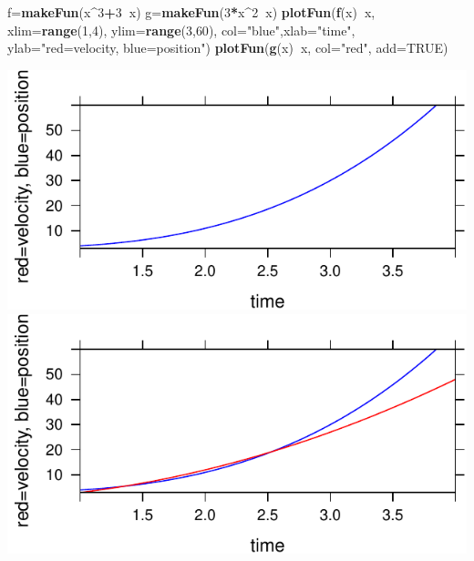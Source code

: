 \documentclass[
]{book}
\newenvironment{Shaded}{\begin{snugshade}}{\end{snugshade}}
\newcommand{\DataTypeTok}[1]{\textcolor[rgb]{0.13,0.29,0.53}{#1}}
\newcommand{\DecValTok}[1]{\textcolor[rgb]{0.00,0.00,0.81}{#1}}
\newcommand{\KeywordTok}[1]{\textcolor[rgb]{0.13,0.29,0.53}{\textbf{#1}}}
\newcommand{\NormalTok}[1]{#1}
\newcommand{\OperatorTok}[1]{\textcolor[rgb]{0.81,0.36,0.00}{\textbf{#1}}}
\newcommand{\OtherTok}[1]{\textcolor[rgb]{0.56,0.35,0.01}{#1}}
\newcommand{\StringTok}[1]{\textcolor[rgb]{0.31,0.60,0.02}{#1}}
\begin{document}
\begin{Shaded}
\begin{Highlighting}[]
\NormalTok{f=}\KeywordTok{makeFun}\NormalTok{(x}\OperatorTok{^}\DecValTok{3}\OperatorTok{+}\DecValTok{3}\OperatorTok{~}\NormalTok{x)}
\NormalTok{g=}\KeywordTok{makeFun}\NormalTok{(}\DecValTok{3}\OperatorTok{*}\NormalTok{x}\OperatorTok{^}\DecValTok{2}\OperatorTok{~}\NormalTok{x)}
\KeywordTok{plotFun}\NormalTok{(}\KeywordTok{f}\NormalTok{(x)}\OperatorTok{~}\NormalTok{x, }\DataTypeTok{xlim=}\KeywordTok{range}\NormalTok{(}\DecValTok{1}\NormalTok{,}\DecValTok{4}\NormalTok{), }\DataTypeTok{ylim=}\KeywordTok{range}\NormalTok{(}\DecValTok{3}\NormalTok{,}\DecValTok{60}\NormalTok{), }
        \DataTypeTok{col=}\StringTok{"blue"}\NormalTok{,}\DataTypeTok{xlab=}\StringTok{"time"}\NormalTok{, }\DataTypeTok{ylab=}\StringTok{"red=velocity, blue=position"}\NormalTok{)}
\KeywordTok{plotFun}\NormalTok{(}\KeywordTok{g}\NormalTok{(x)}\OperatorTok{~}\NormalTok{x, }\DataTypeTok{col=}\StringTok{"red"}\NormalTok{, }\DataTypeTok{add=}\OtherTok{TRUE}\NormalTok{)}
\end{Highlighting}
\end{Shaded}

\begin{center}\includegraphics{_bookdown_files/math135_handbook_files/figure-latex/unnamed-chunk-33-1} \includegraphics{_bookdown_files/math135_handbook_files/figure-latex/unnamed-chunk-33-2} \end{center}
\end{document}
